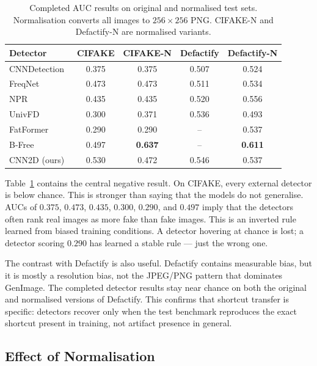 \documentclass{bmvc2k}
\begin{document}
\begin{table}[t]
\centering
\small
\setlength{\tabcolsep}{4pt}
\begin{tabular}{lcccc}
\toprule
\textbf{Detector} & \textbf{CIFAKE} & \textbf{CIFAKE-N} & \textbf{Defactify} & \textbf{Defactify-N} \\
\midrule
CNNDetection~\cite{wang2020cnn} & 0.375 & 0.375 & 0.507 & 0.524 \\
FreqNet~\cite{freqnet}          & 0.473 & 0.473 & 0.511 & 0.534 \\
NPR~\cite{npr}                  & 0.435 & 0.435 & 0.520 & 0.556 \\
UnivFD~\cite{univfd}            & 0.300 & 0.371 & 0.536 & 0.493 \\
FatFormer~\cite{fatformer}      & 0.290 & 0.290 & --    & 0.537 \\
B-Free~\cite{bfree}             & 0.497 & \textbf{0.637} & -- & \textbf{0.611} \\
CNN2D (ours)                    & 0.530 & 0.472 & 0.546 & 0.537 \\
\bottomrule
\end{tabular}
\caption{Completed AUC results on original and normalised test sets. Normalisation converts all images to $256\times256$ PNG. CIFAKE-N and Defactify-N are normalised variants.}
\label{tab:perf}
\end{table}

Table~\ref{tab:perf} contains the central negative result. On CIFAKE, every external detector is below chance. This is stronger than saying that the models do not generalise. AUCs of $0.375$, $0.473$, $0.435$, $0.300$, $0.290$, and $0.497$ imply that the detectors often rank real images as more fake than fake images. This is an inverted rule learned from biased training conditions. A detector hovering at chance is lost; a detector scoring $0.290$ has learned a stable rule --- just the wrong one.

The contrast with Defactify is also useful. Defactify contains measurable bias, but it is mostly a resolution bias, not the JPEG/PNG pattern that dominates GenImage. The completed detector results stay near chance on both the original and normalised versions of Defactify. This confirms that shortcut transfer is specific: detectors recover only when the test benchmark reproduces the exact shortcut present in training, not artifact presence in general.

\subsection{Effect of Normalisation}
\label{sec:norm_results}
\end{document}
